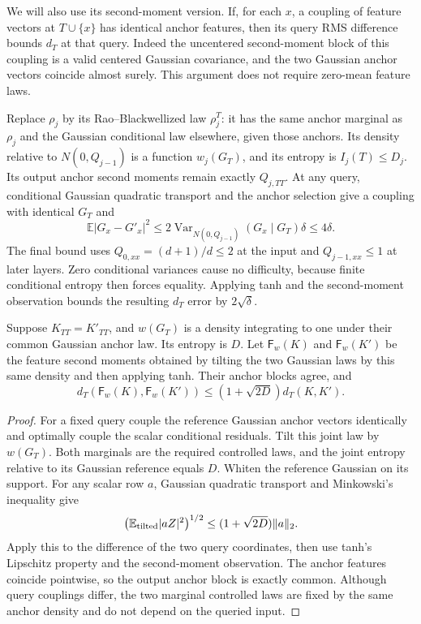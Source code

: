 We will also use its second-moment version. If, for each $x$, a
coupling of feature vectors at $T\cup\{x\}$ has identical anchor
features, then its query RMS difference bounds $d_T$ at that query.
Indeed the uncentered second-moment block of this coupling is a
valid centered Gaussian covariance, and the two Gaussian anchor
vectors coincide almost surely. This argument does not require
zero-mean feature laws.

Replace $\rho_j$ by its Rao--Blackwellized law $\rho_j^T$: it has
the same anchor marginal as $\rho_j$ and the Gaussian conditional
law elsewhere, given those anchors. Its density relative to
$N(0,Q_{j-1})$ is a function $w_j(G_T)$, and its entropy is
$I_j(T)\le D_j$. Its output anchor second moments remain exactly
$Q_{j,TT}$.
At any query, conditional Gaussian quadratic transport and the
anchor selection give a coupling with identical $G_T$ and
\[
 \mathbb E|G_x-G'_x|^2
 \le2\operatorname{Var}_{N(0,Q_{j-1})}(G_x\mid G_T)\delta
 \le4\delta.
\]
The final bound uses $Q_{0,xx}=(d+1)/d\le2$ at the input and
$Q_{j-1,xx}\le1$ at later layers. Zero conditional variances cause
no difficulty, because finite conditional entropy then forces equality.
Applying tanh and the second-moment observation bounds the resulting
$d_T$ error by $2\sqrt\delta$.

\begin{lemma}
\label{lem:critical-anchor-propagation}
Suppose $K_{TT}=K'_{TT}$, and $w(G_T)$ is a density integrating
to one under their common Gaussian anchor law. Its entropy is $D$.
Let $\mathsf F_w(K)$ and $\mathsf F_w(K')$ be the feature second
moments obtained by tilting the two Gaussian laws by this same
density and then applying tanh. Their anchor blocks agree, and
\[
 d_T(\mathsf F_w(K),\mathsf F_w(K'))
 \le(1+\sqrt{2D})d_T(K,K').
\]
\end{lemma}

\begin{proof}
For a fixed query couple the reference Gaussian anchor vectors
identically and optimally couple the scalar conditional residuals.
Tilt this joint law by $w(G_T)$. Both marginals are the required
controlled laws, and the joint entropy relative to its Gaussian
reference equals $D$. Whiten the reference Gaussian on its support.
For any scalar row $a$, Gaussian quadratic transport and Minkowski's
inequality give
\[
 \bigl(\mathbb E_{\rm tilted}|aZ|^2\bigr)^{1/2}
 \le(1+\sqrt{2D})\|a\|_2.
\]
Apply this to the difference of the two query coordinates, then use
tanh's Lipschitz property and the second-moment observation.
The anchor features coincide pointwise, so the output anchor block
is exactly common. Although query couplings differ, the two marginal
controlled laws are fixed by the same anchor density and do not
depend on the queried input.
\end{proof}

